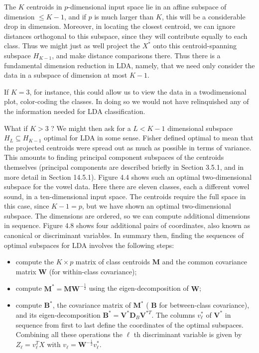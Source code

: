 \documentclass[10pt]{article}
\begin{document}
The $K$ centroids in $p$-dimensional input space lie in an affine subspace of dimension $\leq K-1$, and if $p$ is much larger than $K$, this will be a considerable drop in dimension. Moreover, in locating the closest centroid, we can ignore distances orthogonal to this subspace, since they will contribute equally to each class. Thus we might just as well project the $X^{*}$ onto this centroid-spanning subspace $H_{K-1}$, and make distance comparisons there. Thus there is a fundamental dimension reduction in LDA, namely, that we need only consider the data in a subspace of dimension at most $K-1$.

If $K=3$, for instance, this could allow us to view the data in a twodimensional plot, color-coding the classes. In doing so we would not have relinquished any of the information needed for LDA classification.

What if $K>3$ ? We might then ask for a $L<K-1$ dimensional subspace $H_{L} \subseteq H_{K-1}$ optimal for LDA in some sense. Fisher defined optimal to mean that the projected centroids were spread out as much as possible in terms of variance. This amounts to finding principal component subspaces of the centroids themselves (principal components are described briefly in Section 3.5.1, and in more detail in Section 14.5.1). Figure 4.4 shows such an optimal two-dimensional subspace for the vowel data. Here there are eleven classes, each a different vowel sound, in a ten-dimensional input space. The centroids require the full space in this case, since $K-1=p$, but we have shown an optimal two-dimensional subspace. The dimensions are ordered, so we can compute additional dimensions in sequence. Figure 4.8 shows four additional pairs of coordinates, also known as canonical or discriminant variables. In summary then, finding the sequences of optimal subspaces for LDA involves the following steps:

\begin{itemize}
  \item compute the $K \times p$ matrix of class centroids $\mathbf{M}$ and the common covariance matrix $\mathbf{W}$ (for within-class covariance);
  \item compute $\mathbf{M}^{*}=\mathbf{M W}^{-\frac{1}{2}}$ using the eigen-decomposition of $\mathbf{W}$;
  \item compute $\mathbf{B}^{*}$, the covariance matrix of $\mathbf{M}^{*}$ ( $\mathbf{B}$ for between-class covariance), and its eigen-decomposition $\mathbf{B}^{*}=\mathbf{V}^{*} \mathbf{D}_{B} \mathbf{V}^{* T}$. The columns $v_{\ell}^{*}$ of $\mathbf{V}^{*}$ in sequence from first to last define the coordinates of the optimal subspaces.\\
Combining all these operations the $\ell$ th discriminant variable is given by $Z_{\ell}=v_{\ell}^{T} X$ with $v_{\ell}=\mathbf{W}^{-\frac{1}{2}} v_{\ell}^{*}$.
\end{itemize}
\end{document}

